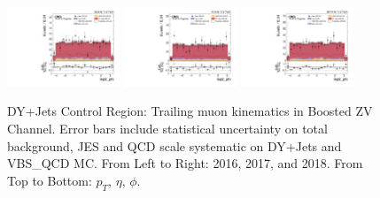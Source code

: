 \begin{figure}[!ht]
  \includegraphics[width=0.30\textwidth]{analysis_plots/2016_zv/cr_vjets_m/lep2_phi.pdf}
  \includegraphics[width=0.30\textwidth]{analysis_plots/2017_zv/cr_vjets_m/lep2_phi.pdf}
  \includegraphics[width=0.30\textwidth]{analysis_plots/2018_zv/cr_vjets_m/lep2_phi.pdf} \\
  \caption[DY+Jets Control Region: Trailing muon kinematics in Boosted ZV Channel]%
  {DY+Jets Control Region: Trailing muon kinematics in Boosted ZV Channel.
    Error bars include statistical uncertainty on total background,
    JES and QCD scale systematic on DY+Jets and VBS\_QCD MC\@. From Left to Right: 2016,
    2017, and 2018. From Top to Bottom: \( p_T \), \( \eta \), \( \phi \).}%
  \label{fig:zv-cr-vjets-m-lep2-pt-eta-phi}
\end{figure}

